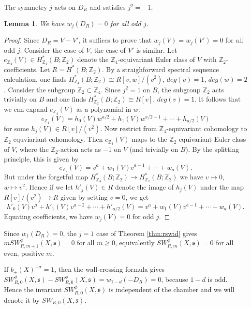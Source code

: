 \documentclass{amsart}
\newtheorem{lemma}[theorem]{Lemma}
\theoremstyle{definition}
\theoremstyle{remark}
\numberwithin{equation}{section}
\begin{document}
The symmetry $j$ acts on $D_R$ and satisfies $j^2 = -1$. 

\begin{lemma}
We have $w_j(D_R) = 0$ for all odd $j$.
\end{lemma}
\begin{proof}
Since $D_R = V-V'$, it suffices to prove that $w_j(V) = w_j(V') = 0$ for all odd $j$. Consider the case of $V$, the case of $V'$ is similar. Let $e_{\mathbb{Z}_4}(V) \in H^*_{\mathbb{Z}_4}(B ; \mathbb{Z}_2)$ denote the $\mathbb{Z}_4$-equivariant Euler class of $V$ with $\mathbb{Z}_2$-coefficients. Let $R = H^*(B ; \mathbb{Z}_2)$. By a straighforward spectral sequence calculation, one finds $H^*_{\mathbb{Z}_4}(B ; \mathbb{Z}_2) \cong R[v,w]/(v^2)$, $deg(v) = 1$, $deg(w) = 2$. Consider the subgroup $\mathbb{Z}_2 \subset \mathbb{Z}_4$. Since $j^2 = 1$ on $B$, the subgroup $\mathbb{Z}_2$ acts trivially on $B$ and one finds $H^*_{\mathbb{Z}_2}(B ; \mathbb{Z}_2) \cong R[v]$, $deg(v) = 1$. It follows that we can expand $e_{\mathbb{Z}_4}(V)$ as a polynomial in $w$:
\[
e_{\mathbb{Z}_4}(V) = h_0(V) w^{a/2} + h_1(V) w^{a/2-1} + \cdots + h_{a/2}(V)
\]
for some $h_j(V) \in R[v]/(v^2)$. Now restrict from $\mathbb{Z}_4$-equivariant cohomology to $\mathbb{Z}_2$-equviariant cohomology. Then $e_{\mathbb{Z}_4}(V)$ maps to the $\mathbb{Z}_2$-equivariant Euler class of $V$, where the $\mathbb{Z}_2$-action acts as $-1$ on $V$ (and trivially on $B$). By the splitting principle, this is given by
\[
e_{\mathbb{Z}_2}(V) = v^a + w_1(V) v^{a-1} + \cdots + w_a(V).
\]
But under the forgetful map $H^*_{\mathbb{Z}_4}(B;\mathbb{Z}_2) \to H^*_{\mathbb{Z}_2}(B ; \mathbb{Z}_2)$ we have $v \mapsto 0$, $w \mapsto v^2$. Hence if we let $h'_j(V) \in R$ denote the image of $h_j(V)$ under the map $R[v]/(v^2) \to R$ given by setting $v=0$, we get
\[
h'_0(V) v^a + h'_1(V) v^{a-2} + \cdots + h'_{a/2}(V) = v^a + w_1(V) v^{a-1} + \cdots + w_a(V).
\]
Equating coefficients, we have $w_j(V) = 0$ for odd $j$.
\end{proof}

Since $w_1(D_R) = 0$, the $j=1$ case of Theorem \ref{thm:rswid} gives $m SW^\phi_{R,m+1}(X , \mathfrak{s}) = 0$ for all $m \ge 0$, equivalently $SW^\phi_{R,m}(X,\mathfrak{s}) = 0$ for all even, positive $m$. 

If $b_+(X)^{-\sigma} = 1$, then the wall-crossing formula gives $SW^\phi_{R,0}(X , \mathfrak{s}) - SW^\phi_{R,0}(X,\mathfrak{s}) = w_{1-d}(-D_R) = 0$, because $1-d$ is odd. Hence the invariant $SW^\phi_{R,0}(X,\mathfrak{s})$ is independent of the chamber and we will denote it by $SW_{R,0}(X,\mathfrak{s})$.
\end{document}
